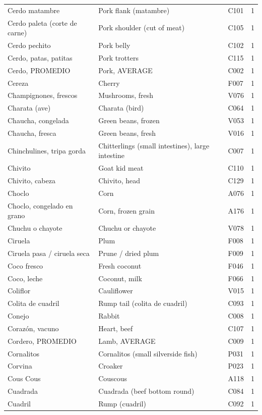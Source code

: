 {\begin{longtable}{p{4.3cm}p{5.5cm}p{1.5cm}p{0.7cm}}
Cerdo matambre & Pork flank (matambre) & C101 & 1\\
Cerdo paleta (corte de carne) & Pork shoulder (cut of meat) & C105 & 1\\
Cerdo pechito & Pork belly & C102 & 1\\
Cerdo, patas, patitas & Pork trotters & C115 & 1\\
Cerdo, PROMEDIO & Pork, AVERAGE & C002 & 1\\
Cereza & Cherry & F007 & 1\\
Champignones, frescos & Mushrooms, fresh & V076 & 1\\
Charata (ave) & Charata (bird) & C064 & 1\\
Chaucha, congelada & Green beans, frozen & V053 & 1\\
Chaucha, fresca & Green beans, fresh & V016 & 1\\
Chinchulines, tripa gorda & Chitterlings (small intestines), large intestine & C007 & 1\\
Chivito & Goat kid meat & C110 & 1\\
Chivito, cabeza & Chivito, head & C129 & 1\\
Choclo & Corn & A076 & 1\\
Choclo, congelado en grano & Corn, frozen grain & A176 & 1\\
Chuchu o chayote & Chuchu or chayote & V078 & 1\\
Ciruela & Plum & F008 & 1\\
Ciruela pasa / ciruela seca & Prune / dried plum & F009 & 1\\
Coco fresco & Fresh coconut & F046 & 1\\
Coco, leche & Coconut, milk & F066 & 1\\
Coliflor & Cauliflower & V015 & 1\\
Colita de cuadril & Rump tail (colita de cuadril) & C093 & 1\\
Conejo & Rabbit & C008 & 1\\
Corazón, vacuno & Heart, beef & C107 & 1\\
Cordero, PROMEDIO & Lamb, AVERAGE & C009 & 1\\
Cornalitos & Cornalitos (small silverside fish) & P031 & 1\\
Corvina & Croaker & P023 & 1\\
Cous Cous & Couscous & A118 & 1\\
Cuadrada & Cuadrada (beef bottom round) & C084 & 1\\
Cuadril & Rump (cuadril) & C092 & 1\\

\end{longtable}}
